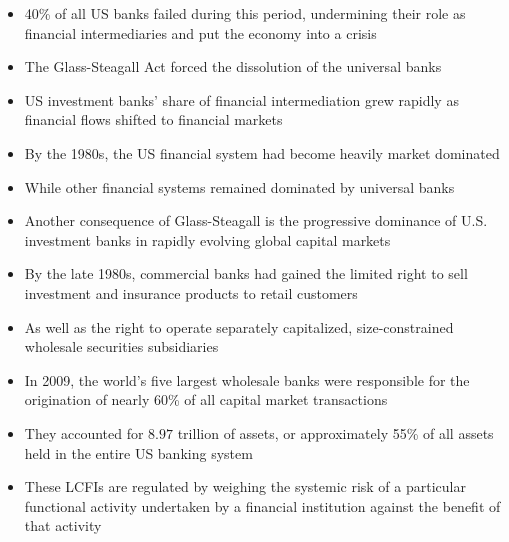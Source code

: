 \documentclass[11pt]{beamer}
\begin{document}
\begin{frame}
\begin{itemize}
\item 40\% of all US banks failed during this period, undermining their role as financial intermediaries and put the economy into a crisis
\item The Glass-Steagall Act forced the dissolution of the universal banks
\item US investment banks’ share of financial intermediation grew rapidly as financial flows shifted to financial markets
\item By the 1980s, the US financial system had become heavily market dominated
\item While other financial systems remained dominated by universal
banks
\item Another consequence of Glass-Steagall is the progressive dominance of U.S. investment banks in rapidly evolving global capital markets
\item By the late 1980s, commercial banks had gained the limited right to sell investment and insurance products to retail customers
\item As well as the right to operate separately capitalized, size-constrained wholesale securities subsidiaries
\end{itemize}
\end{frame}

\begin{frame}
\begin{itemize}
\item In 2009, the world’s five largest wholesale banks were responsible for the origination of nearly 60\% of all capital market transactions
\item They accounted for $8.97$ trillion of assets, or approximately 55\% of all assets held in the entire US banking system
\item These LCFIs are regulated by weighing the systemic risk of a particular functional activity undertaken by a financial institution against the benefit of that activity
\end{itemize}
\end{frame}
\end{document}
